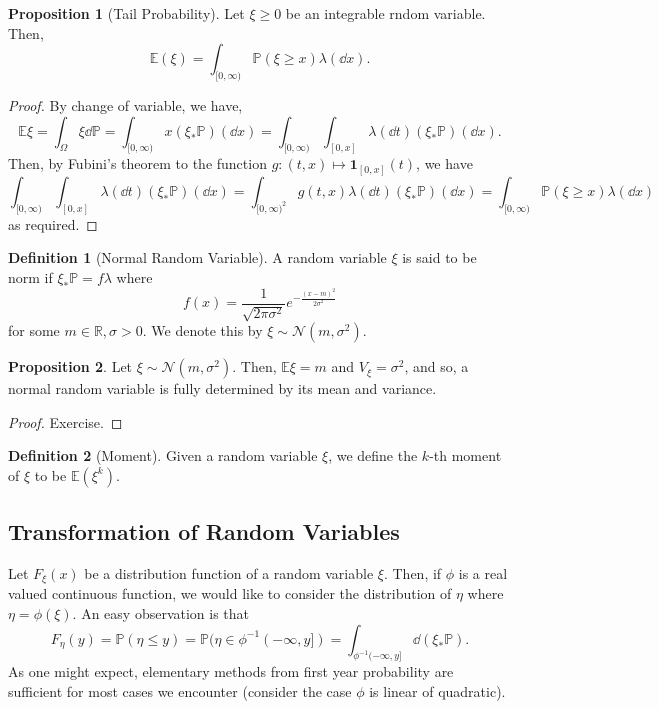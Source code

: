 \documentclass[]{article}
\theoremstyle{definition}
\theoremstyle{definition}
\newtheorem{definition}{Definition}[section]
\newtheorem{proposition}{Proposition}[section]
\begin{document}
\begin{proposition}[Tail Probability]
  Let \(\xi \ge 0\) be an integrable rndom variable. Then, 
  \[\mathbb{E}(\xi) = \int_{[0, \infty)} \mathbb{P}(\xi \ge x) \lambda(\dd x).\]
\end{proposition}
\begin{proof}
  By change of variable, we have,
  \[\mathbb{E}\xi = \int_\Omega \xi \dd \mathbb{P} = \int_{[0, \infty)} x (\xi_*\mathbb{P})(\dd x) = 
    \int_{[0, \infty)}\int_{[0, x]} \lambda(\dd t) (\xi_* \mathbb{P})(\dd x).\]
  Then, by Fubini's theorem to the function \(g : (t, x) \mapsto \mathbf{1}_{[0, x]}(t)\), we have 
  \[\int_{[0, \infty)}\int_{[0, x]} \lambda(\dd t) (\xi_* \mathbb{P})(\dd x) = 
    \int_{[0, \infty)^2} g(t, x) \lambda(\dd t) (\xi_* \mathbb{P})(\dd x) = 
    \int_{[0, \infty)} \mathbb{P}(\xi \ge x) \lambda(\dd x)\]
  as required.
\end{proof}

\begin{definition}[Normal Random Variable]
  A random variable \(\xi\) is said to be norm if \(\xi_* \mathbb{P} = f\lambda\) 
  where 
  \[f(x) = \frac{1}{\sqrt{2\pi \sigma^2}} e^{-\frac{(x - m)^2}{2\sigma^2}}\]
  for some \(m \in \mathbb{R}, \sigma > 0\). We denote this by \(\xi \sim \mathcal{N}(m, \sigma^2)\).
\end{definition}

\begin{proposition}
  Let \(\xi \sim \mathcal{N}(m, \sigma^2)\). Then, \(\mathbb{E}\xi = m\) and \(V_\xi = \sigma^2\),
  and so, a normal random variable is fully determined by its mean and variance.
\end{proposition}
\begin{proof}
  Exercise.
\end{proof}

\begin{definition}[Moment]
  Given a random variable \(\xi\), we define the \(k\)-th moment of \(\xi\) to be 
  \(\mathbb{E}(\xi^{k})\).
\end{definition}

\subsection{Transformation of Random Variables}

Let \(F_\xi(x)\) be a distribution function of a random variable \(\xi\). Then,
if \(\phi\) is a real valued continuous function, we would like to consider the 
distribution of \(\eta\) where \(\eta = \phi(\xi)\). An easy observation is 
that
\[F_\eta(y) = \mathbb{P}(\eta \le y) = \mathbb{P}(\eta \in \phi^{-1}(-\infty, y]) 
  = \int_{\phi^{-1}(-\infty, y]} \dd(\xi_*\mathbb{P}).\]
As one might expect, elementary methods from first year probability are sufficient 
for most cases we encounter (consider the case \(\phi\) is linear of quadratic).
\end{document}
